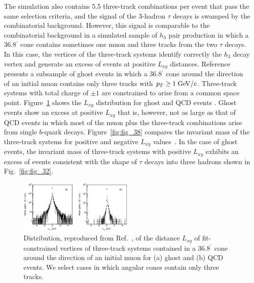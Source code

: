 \documentclass[twocolumn,10pt,prl,preprint,floatfix,nofootinbib,superscriptaddress,showpacs,amssymb]{revtex4}
\def\deg{^\circ}
\begin{document}
 The simulation also contains 5.5 three-track combinations per event that
 pass the same selection criteria, and the signal of the 3-hadron $\tau$
 decays is swamped by the combinatorial background.
 However, this signal is comparable to the combinatorial
 background in a simulated sample of $h_3$ pair
 production in which a 36.8$^{\deg}$ cone contains sometimes
 one muon and three tracks from the two $\tau$ decays.
 In this case, the vertices of the three-track systems identify
 correctly the $h_3$ decay vertex and generate an excess of events at
 positive  $L_{xy}$ distances.
 Reference~\cite{a0disc} presents a subsample of ghost events
 in which 
 a  36.8$^{\deg}$ cone around the
 direction of an initial muon contains only three tracks with
 $p_T \geq 1 \; {\rm GeV/}c$. Three-track systems with total charge of $\pm 1$
 are constrained to arise from a common space point.
 Figure~\ref{fig:fig_37} shows the $L_{xy}$ 
 distribution for ghost and QCD events \cite{a0disc}. Ghost events show an
 excess at positive $L_{xy}$ that is, however, not as large as that of QCD
 events in which most of the muon plus the three-track combinations arise
 from single $b$-quark decays. Figure~\ref{fig:fig_38} compares the invariant
 mass of the three-track systems for positive and negative $L_{xy}$
 values~\cite{a0disc}. In the case of ghost events, the invariant mass of
 three-track systems with positive $L_{xy}$ exhibits an excess of events
 consistent with the  shape of $\tau$ decays into three hadrons shown in
 Fig.~\ref{fig:fig_32}.
 \begin{figure}
 \begin{center}
 \vspace{-0.3in}
 \leavevmode
 \includegraphics*[width=0.5\textwidth]{fa0_37.eps}
 \caption[]{Distribution, reproduced from Ref.~\cite{a0disc}, of the distance
            $L_{xy}$ of fit-constrained vertices of three-track systems
            contained in a $36.8^{\deg}$ cone around the direction of an 
	    initial muon for (a) ghost and (b) QCD events. We select cases
            in which angular cones contain only three tracks.}
 \label{fig:fig_37}
 \end{center}
 \end{figure}
\end{document}
